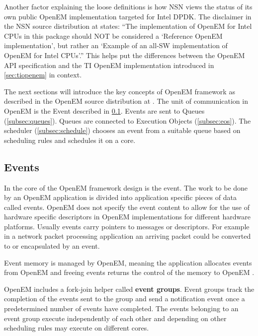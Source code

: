 Another factor explaining the loose definitions is how NSN views the status of its own public OpenEM implementation targeted for Intel DPDK. The disclaimer in the NSN source distribution at \cite{openempage} states: ``The implementation of OpenEM for Intel CPUs in this package should NOT be considered a `Reference OpenEM implementation', but rather an `Example of an all-SW implementation of OpenEM for Intel CPUs'.'' This helps put the differences between the OpenEM API specification and the TI OpenEM implementation introduced in \ref{sec:tiopenem} in context.

The next sections will introduce the key concepts of OpenEM framework as described in the OpenEM source distribution at \cite{openempage}. The unit of communication in OpenEM is the Event described in \ref{subsec:event}. Events are sent to Queues (\ref{subsec:queues}). Queues are connected to Execution Objects (\ref{subsec:eos}). The scheduler (\ref{subsec:schedule}) chooses an event from a suitable queue based on scheduling rules and schedules it on a core.

\subsection{Events}
\label{subsec:event}
In the core of the OpenEM framework design is the event. The work to be done by an OpenEM application is divided into application specific pieces of data called events. OpenEM does not specify the event content to allow for the use of hardware specific descriptors  in OpenEM implementations for different hardware platforms. Usually events carry pointers to messages or descriptors. \cite{openemintro} For example in a network packet processing application an arriving packet could be converted to or encapsulated by an event.

Event memory is managed by OpenEM, meaning the application allocates events from OpenEM and freeing events returns the control of the memory to OpenEM \cite{openemintro}. 

OpenEM includes a fork-join helper called \textbf{event groups}. Event groups track the completion of the events sent to the group and send a notification event once a predetermined number of events have completed. The events belonging to an event group execute independently of each other and depending on other scheduling rules may execute on different cores. \cite{openemintro}

